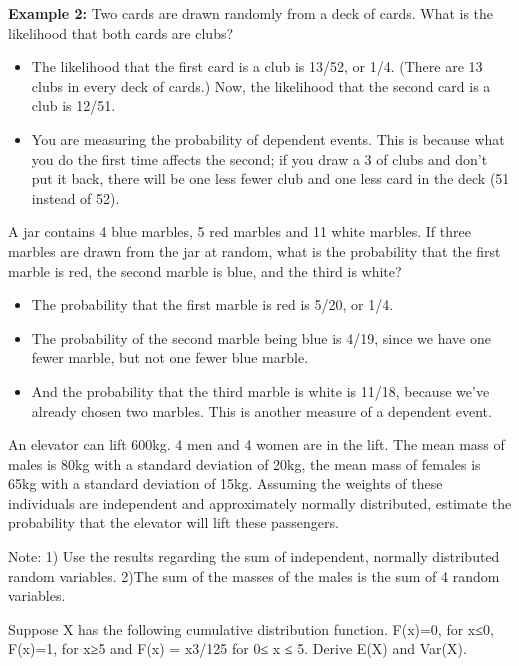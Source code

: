 \item \textbf{Example 2:} Two cards are drawn randomly from a deck of cards. What is the likelihood that both cards are clubs?
\begin{itemize}
\item The likelihood that the first card is a club is 13/52, or 1/4. (There are 13 clubs in every deck of cards.) Now, the likelihood that the second card is a club is 12/51.
\item You are measuring the probability of dependent events. This is because what you do the first time affects the second; if you draw a 3 of clubs and don't put it back, there will be one less fewer club and one less card in the deck (51 instead of 52).
\end{itemize}
\item A jar contains 4 blue marbles, 5 red marbles and 11 white marbles. If three marbles are drawn from the jar at random, what is the probability that the first marble is red, the second marble is blue, and the third is white?
\begin{itemize}
\item The probability that the first marble is red is 5/20, or 1/4. 
\item The probability of the second marble being blue is 4/19, since we have one fewer marble, but not one fewer blue marble. 
\item And the probability that the third marble is white is 11/18, because we've already chosen two marbles. This is another measure of a dependent event.
\end{itemize}

\item  An elevator can lift 600kg. 4 men and 4 women are in the lift. The mean mass of males is 80kg with a standard deviation of 20kg, the mean mass of females is 65kg with a standard deviation of 15kg. Assuming the weights of these individuals are independent and approximately normally distributed, estimate the probability that the elevator will lift these passengers. 

Note: 1) Use the results regarding the sum of independent, normally distributed random variables. 
2)The sum of the masses of the males is the sum of 4 random variables.



\item Suppose X has the following cumulative distribution function. F(x)=0, for x≤0, 
F(x)=1, for x≥5 and F(x) = x3/125 for 0≤ x ≤ 5. Derive E(X) and Var(X).




